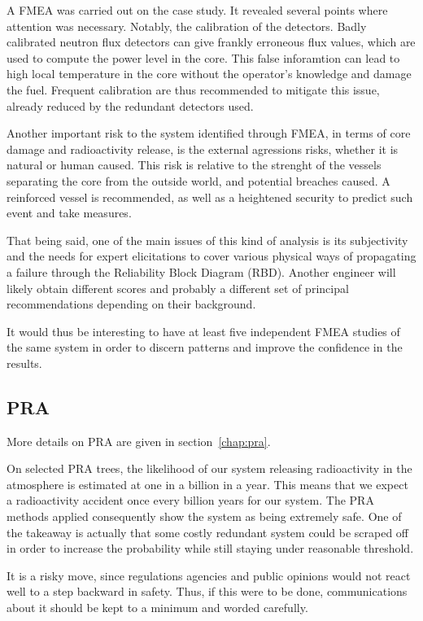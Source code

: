A FMEA was carried out on the case study. It revealed several points where attention was necessary. Notably, the calibration of the detectors. Badly calibrated neutron flux detectors can give frankly erroneous flux values, which are used to compute the power level in the core. This false inforamtion can lead to high local temperature in the core without the operator's knowledge and damage the fuel. Frequent calibration are thus recommended to mitigate this issue, already reduced by the redundant detectors used.

Another important risk to the system identified through FMEA, in terms of core damage and radioactivity release, is the external agressions risks, whether it is natural or human caused. This risk is relative to the strenght of the vessels separating the core from the outside world, and potential breaches caused. A reinforced vessel is recommended, as well as a heightened security to predict such event and take measures.

That being said, one of the main issues of this kind of analysis is its subjectivity and the needs for expert elicitations to cover various physical ways of propagating a failure through the Reliability Block Diagram (RBD). Another engineer will likely obtain different scores and probably a different set of principal recommendations depending on their background.

It would thus be interesting to have at least five independent FMEA studies of the same system in order to discern patterns and improve the confidence in the results.

\subsection{PRA}

More details on PRA are given in section~\ref{chap:pra}.

On selected PRA trees, the likelihood of our system releasing radioactivity in the atmosphere is estimated at one in a billion in a year. This means that we expect a radioactivity accident once every billion years for our system. The PRA methods applied consequently show the system as being extremely safe. One of the takeaway is actually that some costly redundant system could be scraped off in order to increase the probability while still staying under reasonable threshold.

It is a risky move, since regulations agencies and public opinions would not react well to a step backward in safety. Thus, if this were to be done, communications about it should be kept to a minimum and worded carefully.

